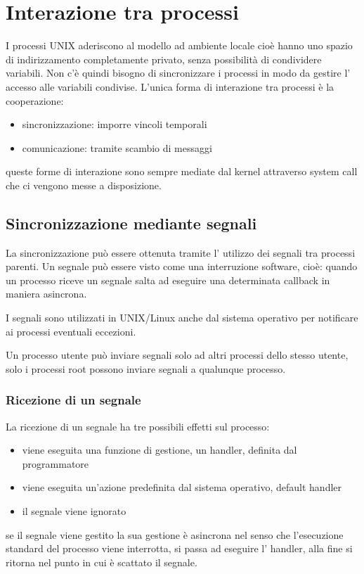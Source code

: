 \section{Interazione tra processi}
I processi UNIX aderiscono al modello ad ambiente locale cioè hanno uno spazio di indirizzamento completamente privato, senza possibilità di condividere variabili.
Non c'è quindi bisogno di sincronizzare i processi in modo da gestire l' accesso alle variabili condivise.
L'unica forma di interazione tra processi è la cooperazione:
\begin{itemize}
    \item sincronizzazione: imporre vincoli temporali
    \item comunicazione: tramite scambio di messaggi
\end{itemize}
queste forme di interazione sono sempre mediate dal kernel attraverso system call che ci vengono messe a disposizione.

\subsection{Sincronizzazione mediante segnali}
La sincronizzazione può essere ottenuta tramite l' utilizzo dei segnali tra processi parenti.
Un segnale può essere visto come una interruzione software, cioè: quando un processo riceve un segnale salta ad eseguire una determinata callback in maniera asincrona.

I segnali sono utilizzati in UNIX/Linux anche dal sistema operativo per notificare ai processi eventuali eccezioni.

Un processo utente può inviare segnali solo ad altri processi dello stesso utente, solo i processi root possono inviare segnali a qualunque processo.

\subsubsection{Ricezione di un segnale}
La ricezione di un segnale ha tre possibili effetti sul processo:
\begin{itemize}
    \item viene eseguita una funzione di gestione, un handler, definita dal programmatore
    \item viene eseguita un'azione predefinita dal sistema operativo, default handler
    \item il segnale viene ignorato
\end{itemize}
se il segnale viene gestito la sua gestione è asincrona nel senso che l'esecuzione standard del processo viene interrotta, si passa ad eseguire l' handler, alla fine si ritorna nel punto in cui è scattato il segnale.

